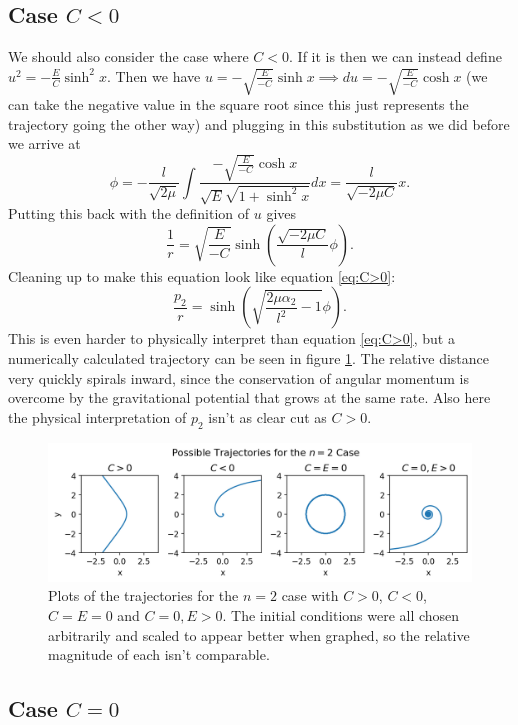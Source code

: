 \documentclass[letterpaper, reqno,11pt]{article}
\begin{document}
\subsection{Case $C<0$}

We should also consider the case where $C<0$. If it is then we can instead define $u^2=-\frac{E}{C}\sinh^2x$. Then we have $u=-\sqrt{\frac{E}{-C}}\sinh x \implies du=-\sqrt{\frac{E}{-C}} \cosh x$ (we can take the negative value in the square root since this just represents the trajectory going the other way) and plugging in this substitution as we did before we arrive at 
\[
\phi = -\frac{l}{\sqrt{2\mu} }\int \frac{-\sqrt{\frac{E}{-C}} \cosh x}{\sqrt{E} \sqrt{1+\sinh^2 x}}dx=\frac{l}{\sqrt{-2\mu C}}x
.\]
Putting this back with the definition of $u$ gives 
\[
\frac{1}{r}=\sqrt{\frac{E}{-C}} \sinh\left( \frac{\sqrt{-2\mu C}}{l}\phi \right) 
.\]
Cleaning up to make this equation look like equation \ref{eq:C>0}: 
\begin{equation}\label{C<0}
\frac{p_2}{r}=\sinh\left( \sqrt{\frac{2\mu\alpha_2}{l^2}-1} \phi \right) 
.\end{equation}
This is even harder to physically interpret than equation \ref{eq:C>0}, but a numerically calculated trajectory can be seen in figure \ref{fig:trajectories}. The relative distance very quickly spirals inward, since the conservation of angular momentum is overcome by the gravitational potential that grows at the same rate. Also here the physical interpretation of $p_2$ isn't as clear cut as $C>0$.  

\begin{figure}[htpb]
    \centering
    \includegraphics[width=1\textwidth]{trajectories}
    \caption{Plots of the trajectories for the $n=2$ case with $C>0$, $C<0$, $C=E=0$ and $C=0,E>0$. The initial conditions were all chosen arbitrarily and scaled to appear better when graphed, so the relative magnitude of each isn't comparable. }
    \label{fig:trajectories}
\end{figure}

\subsection{Case $C=0$}
\end{document}

